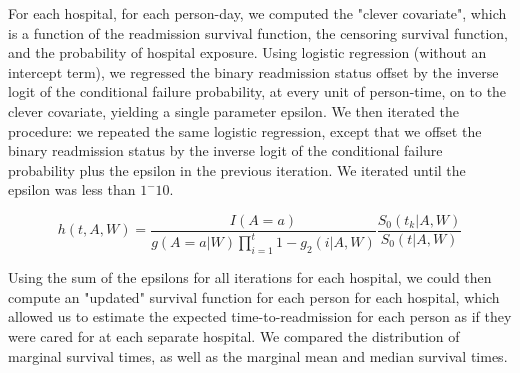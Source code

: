 \documentclass[]{article}\usepackage[]{graphicx}\usepackage[]{color}
\begin{document}
For each hospital, for each person-day, we computed the "clever covariate", which is a function of the readmission survival function, the censoring survival function, and the probability of hospital exposure. Using logistic regression (without an intercept term), we regressed the binary readmission status offset by the inverse logit of the conditional failure probability, at every unit of person-time, on to the clever covariate, yielding a single parameter epsilon. We then iterated the procedure: we repeated the same logistic regression, except that we offset the binary readmission status by the inverse logit of the conditional failure probability plus the epsilon in the previous iteration. We iterated until the epsilon was less than $1^-10$.

\begin{equation}
\label{survival_clever_covariate} 
h(t,A,W)=\frac{I(A=a)}{g(A=a|W)\prod_{i=1}^t1-g_2(i|A,W)}\frac{S_0(t_k|A,W)}{S_0(t|A,W)}
\end{equation}

Using the sum of the epsilons for all iterations for each hospital, we could then compute an "updated" survival function for each person for each hospital, which allowed us to estimate the expected time-to-readmission for each person as if they were cared for at each separate hospital. We compared the distribution of marginal survival times, as well as the marginal mean and median survival times.



\end{document}
